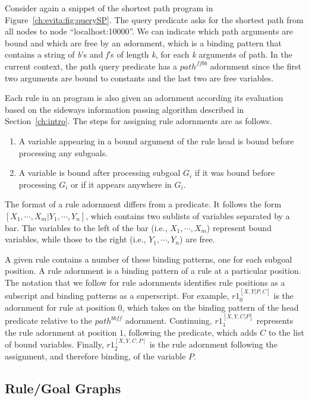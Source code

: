 Consider again a snippet of the shortest path program in Figure~\ref{ch:evita:fig:querySP}.  
The query predicate  asks for the shortest path from all nodes to node
``localhost:10000''.  We can indicate which path arguments are bound and which
are free by an {\emph adornment}, which is a binding pattern that contains a
string of {\emph b's} and {\emph f's} of length {\emph k}, for each {\emph k}
arguments of path.  In the current context, the {\emph path} query predicate has
a $path^{ffbb}$ adornment since the first two arguments are bound to constants
and the last two are free variables.

Each rule in an \OVERLOG program is also given an adornment according its
evaluation based on the sideways information passing algorithm described in
Section~\ref{ch:intro}.  The steps for assigning rule adornments are as
follows.
\begin{enumerate}
\item A variable appearing in a bound argument of the rule head is bound before processing any subgoals.
\item A variable is bound after processing subgoal $G_i$ if it was bound
  before processing $G_i$ or if it appears anywhere in $G_i$.
\end{enumerate}
The format of a rule adornment differs from a predicate.  It follows the form
$[X_1,\cdots,X_m|Y_1,\cdots,Y_n]$, which contains two sublists of variables
separated by a bar.  The variables to the left of the bar (i.e.,
$X_1,\cdots,X_m$) represent bound variables, while those to the right (i.e.,
$Y_1,\cdots,Y_n$) are free. 

A given rule contains a number of these binding patterns, one for each subgoal
position.  A rule adornment is a binding pattern of a rule at a particular
position.  The notation that we follow for rule adornments identifies rule
positions as a subscript and binding patterns as a superscript.  For example,
$r1_0^{[X,Y|P,C]}$ is the adornment for rule  at position $0$, which
takes on the binding pattern of the head predicate relative to the
$path^{bbff}$ adornment. Continuing, $r1_1^{[X,Y,C|P]}$ represents the rule
adornment at position $1$, following the  predicate, which adds
$C$ to the list of bound variables. Finally, $r1_2^{[X,Y,C,P]}$ is the
rule adornment following the assignment, and therefore binding, of the variable
$P$.

\subsection{Rule/Goal Graphs}

